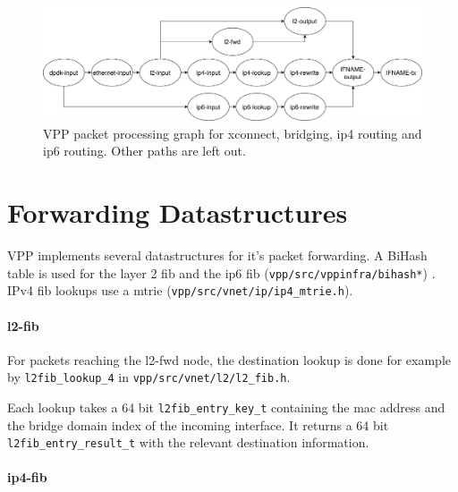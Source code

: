 \begin{figure}[!ht]
\noindent\hspace{0.5mm}\includegraphics[width=\linewidth]{pics/vpp-nodes-horizontal.png}
\caption{VPP packet processing graph for xconnect, bridging, ip4 routing and ip6 routing. Other paths are left out. }
\label{nodegraph}
\end{figure}

 
\section{Forwarding Datastructures}

VPP implements several datastructures for it's packet forwarding. A
BiHash table is used for the layer 2 \Ac{fib} and the ip6 \Ac{fib}
(\lstinline|vpp/src/vppinfra/bihash*|) \cite{vppwiki:bihash}. IPv4
\Ac{fib} lookups use a mtrie
(\lstinline|vpp/src/vnet/ip/ip4_mtrie.h|).



\paragraph{l2-fib}

For packets reaching the l2-fwd node, the destination lookup is done
for example by \lstinline|l2fib_lookup_4| in
\lstinline|vpp/src/vnet/l2/l2_fib.h|. 

Each lookup takes a 64 bit \lstinline|l2fib_entry_key_t| containing
the mac address and the bridge domain index of the incoming interface.
It returns a 64 bit \lstinline|l2fib_entry_result_t| with the relevant
destination information. 


\paragraph{ip4-fib}

